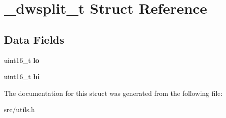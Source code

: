 \section{\+\_\+dwsplit\+\_\+t Struct Reference}
\label{struct__dwsplit__t}
\subsection*{Data Fields}
\begin{DoxyCompactItemize}
\item 
\mbox{\label{struct__dwsplit__t_a3d4c24a2f644f4efb5c98246ac6ec3bd}} 
uint16\+\_\+t {\bfseries lo}
\item 
\mbox{\label{struct__dwsplit__t_a11d514cfb83b5e091c2bf1dc2b15ec27}} 
uint16\+\_\+t {\bfseries hi}
\end{DoxyCompactItemize}


The documentation for this struct was generated from the following file\+:\begin{DoxyCompactItemize}
\item 
src/utils.\+h\end{DoxyCompactItemize}

